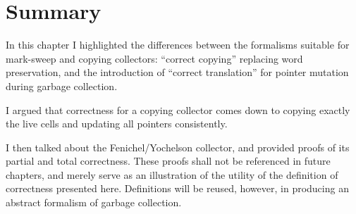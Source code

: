 
\section{Summary}
\label{sec:copying-summary}

In this chapter I highlighted the differences between the formalisms
suitable for \gls{mark-sweep} and \gls{copying} \glspl{collector}:
``correct copying'' replacing word preservation, and the introduction
of ``correct translation'' for \gls{pointer} mutation during
\gls{garbage collection}.

I argued that correctness for a \gls{copying} \gls{collector} comes
down to copying exactly the \glspl{live cell} and updating all
\glspl{pointer} consistently.

I then talked about the Fenichel/Yochelson\cite{Fenichel69} collector,
and provided proofs of its partial and total correctness. These proofs
shall not be referenced in future chapters, and merely serve as an
illustration of the utility of the definition of correctness presented
here. Definitions will be reused, however, in producing an abstract
formalism of garbage collection.
